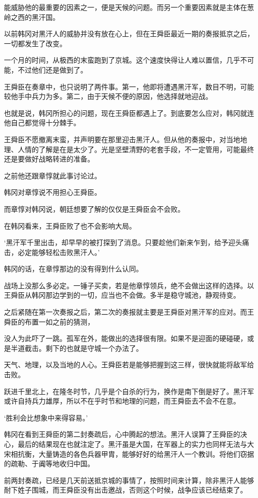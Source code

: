 能威胁他的最重要的因素之一，便是天候的问题。而另一个重要因素就是主体在葱岭之西的黑汗国。

以前韩冈对黑汗人的威胁并没有放在心上，但在王舜臣最近一期的奏报抵京之后，一切都发生了改变。

一个月的时间，从极西的末蛮跑到了京城。这个速度快得让人难以置信，几乎不可能，不过他们还是做到了。

王舜臣在奏章中，也只说明了两件事。第一，他即将遭遇黑汗军，数目不明，可能较他手中兵力为多。第二，由于天候不便的原因，他选择就地迎战。

也就是说，韩冈所担心的问题，现在王舜臣都遇上了。到底要怎么应对，韩冈就连他自己都觉得十分棘手。

王舜臣不愿撤离末蛮，并声明要在那里迎击黑汗人。但从他的奏报中，对当地地理、人情的了解是在是太少了。光是坚壁清野的老套手段，不一定管用，可能最终还是要做好战略转进的准备。

之前他还跟章惇就此事讨论过。

韩冈对章惇说不用担心王舜臣。

而章惇对韩冈说，朝廷想要了解的仅仅是王舜臣会不会败。

在韩冈看来，王舜臣败了也不会影响大局。

‘黑汗军千里出击，却早早的被打探到了消息。只要趁他们新来乍到，给予迎头痛击，必定能够轻松击败黑汗人。’

韩冈的话，在章惇那边的没有得到什么认同。

战场上没那么多必定。一锤子买卖，若是他章惇领兵，绝不会做出这样的选择。以王舜臣从韩冈那边学到的一切，应当也不会做。多半是稳守城池，静观待变。

之后紧随在第一次奏报之后，第二次的奏报就主要是王舜臣对黑汗军的应对。而王舜臣的布置一如之前的猜测，

没人为此吓了一跳。孤军在外，能做出的选择很有限。如果不是迎面的硬碰硬，或是半道截击。剩下的也就是守城一个办法了。

天气、地理，以及当地的人心。王舜臣若是能够把握到这三样，很快就能将敌军给击败。

跃进千里北上，在隆冬时节，几乎是个自杀的行为，换作是南下倒是好了。黑汗军或许自持兵力雄厚，所以不在乎时节和地理的问题，而王舜臣去不会不在意。

‘胜利会比想象中来得容易。’

韩冈在看到王舜臣的第二封奏疏后，心中腾起的想法。黑汗人误算了王舜臣的决心，最后的结果现在也就注定了。黑汗虽是大国，在军器上的实力也同样无法与大宋相抗衡，大量铸造的各色兵器甲胄，能够好好的给黑汗人一个教训。将他们窃据的疏勒、于阗等地收归中国。

前两封奏疏，已经是几天前送抵京城的事情了，按照时间来计算，除非黑汗人能够耐下姓子围城，而王舜臣没有出击邀战，否则这个时候，战争应该已经结束了。

